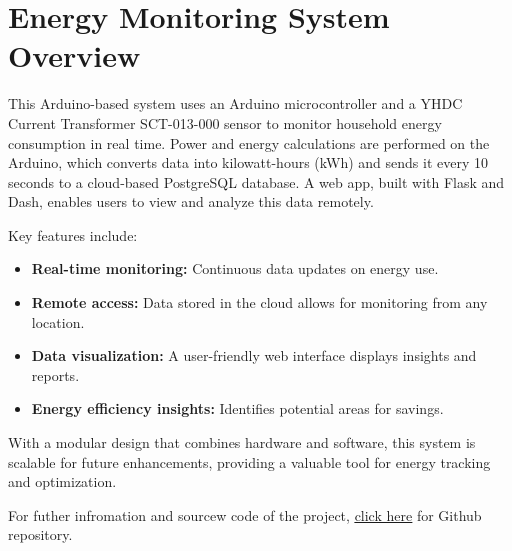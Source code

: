 \section{Energy Monitoring System Overview}

This Arduino-based system uses an Arduino microcontroller and a YHDC Current Transformer SCT-013-000 sensor to monitor household energy consumption in real time. Power and energy calculations are performed on the Arduino, which converts data into kilowatt-hours (kWh) and sends it every 10 seconds to a cloud-based PostgreSQL database. A web app, built with Flask and Dash, enables users to view and analyze this data remotely.

Key features include:
\begin{itemize}
    \item \textbf{Real-time monitoring:} Continuous data updates on energy use.
    \item \textbf{Remote access:} Data stored in the cloud allows for monitoring from any location.
    \item \textbf{Data visualization:} A user-friendly web interface displays insights and reports.
    \item \textbf{Energy efficiency insights:} Identifies potential areas for savings.
\end{itemize}

With a modular design that combines hardware and software, this system is scalable for future enhancements, providing a valuable tool for energy tracking and optimization.

For futher infromation and sourcew code of the project, \href{https://github.com/Jubel075/Energy-Monitor}{\underline{click here}} for Github repository.
